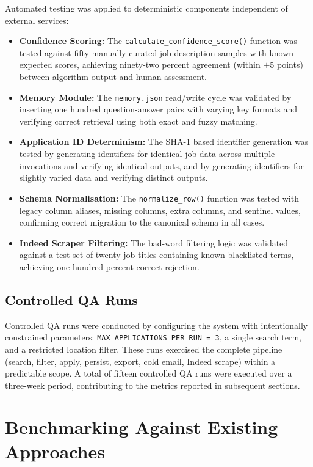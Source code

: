 \documentclass[12pt, a4paper, oneside]{report}
\begin{document}
Automated testing was applied to deterministic components independent of external services:

\begin{itemize}
    \item \textbf{Confidence Scoring:} The \texttt{calculate\_confidence\_score()} function was tested against fifty manually curated job description samples with known expected scores, achieving ninety-two percent agreement (within $\pm$5 points) between algorithm output and human assessment.
    \item \textbf{Memory Module:} The \texttt{memory.json} read/write cycle was validated by inserting one hundred question-answer pairs with varying key formats and verifying correct retrieval using both exact and fuzzy matching.
    \item \textbf{Application ID Determinism:} The SHA-1 based identifier generation was tested by generating identifiers for identical job data across multiple invocations and verifying identical outputs, and by generating identifiers for slightly varied data and verifying distinct outputs.
    \item \textbf{Schema Normalisation:} The \texttt{normalize\_row()} function was tested with legacy column aliases, missing columns, extra columns, and sentinel values, confirming correct migration to the canonical schema in all cases.
    \item \textbf{Indeed Scraper Filtering:} The bad-word filtering logic was validated against a test set of twenty job titles containing known blacklisted terms, achieving one hundred percent correct rejection.
\end{itemize}

\subsection{Controlled QA Runs}

Controlled QA runs were conducted by configuring the system with intentionally constrained parameters: \texttt{MAX\_APPLICATIONS\_PER\_RUN = 3}, a single search term, and a restricted location filter. These runs exercised the complete pipeline (search, filter, apply, persist, export, cold email, Indeed scrape) within a predictable scope. A total of fifteen controlled QA runs were executed over a three-week period, contributing to the metrics reported in subsequent sections.


\section{Benchmarking Against Existing Approaches}
\label{sec:benchmarking}
\end{document}
